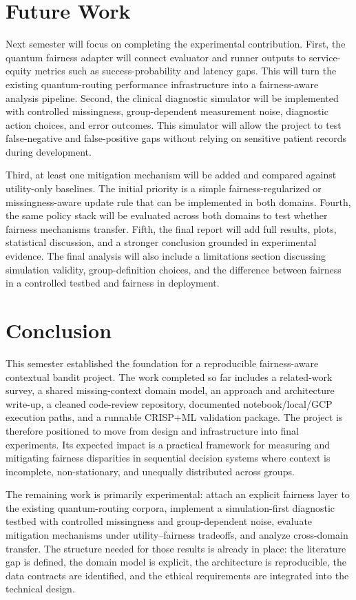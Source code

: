 \documentclass[conference]{IEEEtran}
\begin{document}
\section{Future Work}
Next semester will focus on completing the experimental contribution. First,
the quantum fairness adapter will connect evaluator and runner outputs to
service-equity metrics such as success-probability and latency gaps. This will
turn the existing quantum-routing performance infrastructure into a
fairness-aware analysis pipeline. Second, the clinical diagnostic simulator
will be implemented with controlled missingness, group-dependent measurement
noise, diagnostic action choices, and error outcomes. This simulator will allow
the project to test false-negative and false-positive gaps without relying on
sensitive patient records during development.

Third, at least one mitigation mechanism will be added and compared against
utility-only baselines. The initial priority is a simple fairness-regularized
or missingness-aware update rule that can be implemented in both domains.
Fourth, the same policy stack will be evaluated across both domains to test
whether fairness mechanisms transfer. Fifth, the final report will add full
results, plots, statistical discussion, and a stronger conclusion grounded in
experimental evidence. The final analysis will also include a limitations
section discussing simulation validity, group-definition choices, and the
difference between fairness in a controlled testbed and fairness in deployment.

\section{Conclusion}
This semester established the foundation for a reproducible fairness-aware
contextual bandit project. The work completed so far includes a related-work
survey, a shared missing-context domain model, an approach and architecture
write-up, a cleaned code-review repository, documented notebook/local/GCP
execution paths, and a runnable CRISP+ML validation package. The project is
therefore positioned to move from design and infrastructure into final
experiments. Its expected impact is a practical framework for measuring and
mitigating fairness disparities in sequential decision systems where context
is incomplete, non-stationary, and unequally distributed across groups.

The remaining work is primarily experimental: attach an explicit fairness
layer to the existing quantum-routing corpora, implement a simulation-first
diagnostic testbed with controlled missingness and group-dependent noise,
evaluate mitigation mechanisms under utility--fairness tradeoffs, and analyze
cross-domain transfer. The structure needed for those results is already in
place: the literature gap is defined, the domain model is explicit, the
architecture is reproducible, the data contracts are identified, and the
ethical requirements are integrated into the technical design.



\end{document}

